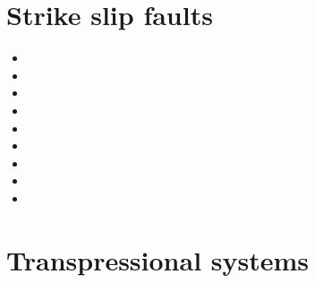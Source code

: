 \section{Strike slip faults} 

\begin{small}
\begin{itemize}
\item[\nineteenseventyfour]
\item[\nineteeneightyeight]
\item[\nineteenninetytwo]
\item[\twothousandeleven]
\item[\twothousandfourteen]
\item[\twothousandseventeen]
\item[\twothousandtwenty]
\item[\twothousandtwentytwo]
\item[\twothousandtwentyfour]
\end{itemize}
\end{small}

\section{Transpressional systems} 

